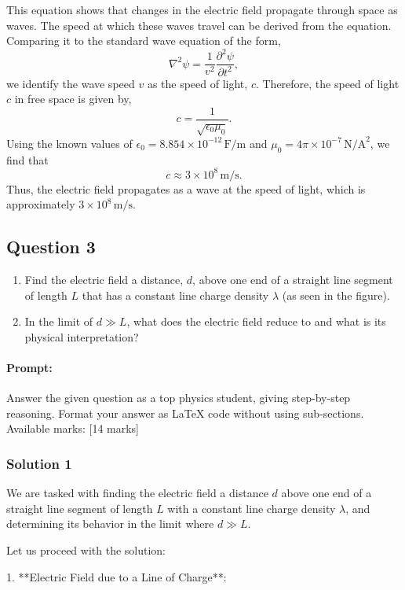 \documentclass{article}
\begin{document}
This equation shows that changes in the electric field propagate through space as waves. The speed at which these waves travel can be derived from the equation. Comparing it to the standard wave equation of the form,
\[
\nabla^2 \psi = \frac{1}{v^2} \frac{\partial^2 \psi}{\partial t^2},
\]
we identify the wave speed $v$ as the speed of light, $c$. Therefore, the speed of light $c$ in free space is given by,
\[
c = \frac{1}{\sqrt{\epsilon_0 \mu_0}}.
\]
Using the known values of $\epsilon_0 = 8.854 \times 10^{-12} \, \text{F/m}$ and $\mu_0 = 4\pi \times 10^{-7} \, \text{N/A}^2$, we find that
\[
c \approx 3 \times 10^8 \, \text{m/s}.
\]
Thus, the electric field propagates as a wave at the speed of light, which is approximately $3 \times 10^8 \, \text{m/s}$.


\subsection{Question 3}
\begin{enumerate}
    \item Find the electric field a distance, \( d \), above one end of a straight line segment of length \( L \) that has a constant line charge density \( \lambda \) (as seen in the figure).
    \item In the limit of \( d \gg L \), what does the electric field reduce to and what is its physical interpretation?
\end{enumerate}


\paragraph{Prompt: \\} 
Answer the given question as a top physics student, giving step-by-step reasoning. Format your answer as LaTeX code without using sub-sections. Available marks: [14 marks]

\subsubsection{Solution 1}
We are tasked with finding the electric field a distance \( d \) above one end of a straight line segment of length \( L \) with a constant line charge density \( \lambda \), and determining its behavior in the limit where \( d \gg L \).

Let us proceed with the solution:

1. **Electric Field due to a Line of Charge**: 
\end{document}
